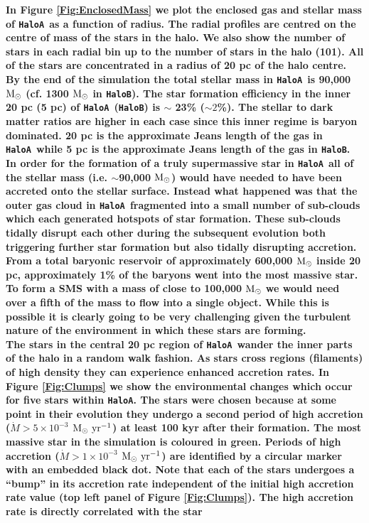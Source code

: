 \documentclass[twocolumn,iop,revtex4]{openjournal}
\newcommand{\msolar} {$\rm{M_{\odot}}~$}
\newcommand{\msolarc} {$\rm{M_{\odot}}$}
\newcommand{\msolaryrc} {$\rm{M_{\odot}~yr^{-1}}$}
\newcommand{\ha} {\texttt{HaloA~}}
\newcommand{\hac} {\texttt{HaloA}}
\newcommand{\hbc} {\texttt{HaloB}}
\begin{document}
\noindent \textbf{In Figure \ref{Fig:EnclosedMass} we plot the enclosed gas and stellar mass of \ha as a function of radius.
The radial profiles are centred on the centre of mass of the stars in the halo. We also show the
number of stars in each radial bin up to the number of stars in the halo (101). All of the stars
are concentrated in a radius of 20 pc of the halo centre. By the end of the simulation the total stellar mass
in \ha is 90,000 \msolar (cf. 1300
\msolar in \hbc). The star formation efficiency in the inner 20 pc (5 pc) of \ha (\hbc) is $\sim$ 23\%
($\sim 2$\%). The stellar to dark matter ratios are higher in each case since this 
inner regime is baryon dominated. 20 pc is the approximate Jeans length of the gas in \ha while 5 pc is the approximate Jeans
length of the gas in \hbc. In order for the formation of a truly supermassive star in \ha all of the
stellar mass
(i.e. $\sim$90,000 \msolarc) would have needed to have been accreted onto the stellar surface. Instead
what happened was that the outer gas cloud in \ha fragmented into a small number of sub-clouds which
each generated hotspots of star formation. These sub-clouds tidally disrupt each other during the
subsequent evolution both triggering further star formation but also tidally disrupting accretion.
From a total baryonic reservoir of approximately 600,000 \msolar inside 20 pc, approximately 1\% of the baryons went
into the most massive star. To form a SMS
with a mass of close to 100,000 \msolar we would need over a fifth of the mass to 
flow into a single object. While this is possible it is clearly going to be 
very challenging given the turbulent nature of the environment in which these stars are forming. \\
\indent The stars in the central 20 pc region of \ha wander the inner parts of the halo in a random walk fashion. As
stars cross regions (filaments) of high density they can experience enhanced accretion rates. In Figure
\ref{Fig:Clumps} we show the environmental changes which occur for five stars within \hac. The stars were
chosen because at some point in their evolution they undergo a second period of high accretion
($\dot{M} > 5 \times 10^{-3}$ \msolaryrc) at least 100 kyr after their formation.
The most massive star in the simulation is coloured in green. Periods of high accretion ($\dot{M} > 1 \times 10^{-3}$ \msolaryrc)
are identified by a circular marker with an embedded black dot. 
Note that each of the stars undergoes a ``bump'' in its accretion rate independent of the initial high accretion
rate value (top left panel of Figure \ref{Fig:Clumps}). The high accretion rate is directly correlated with the star
}
\end{document}
